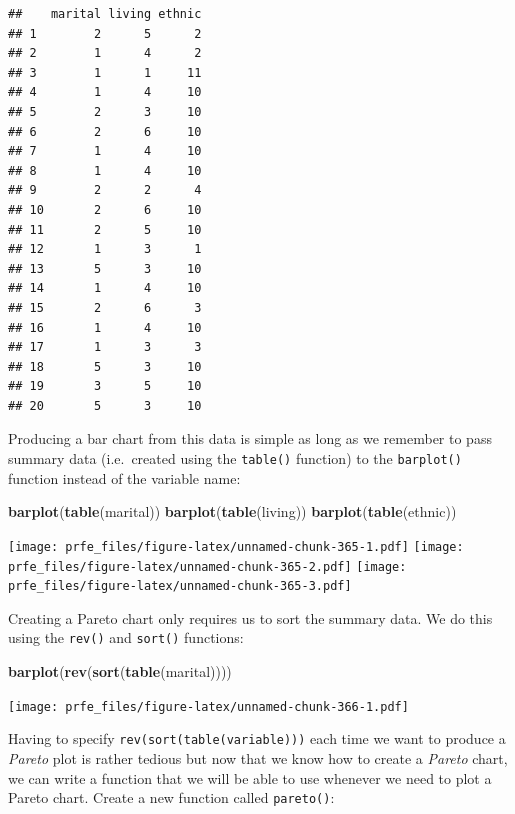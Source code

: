 \documentclass[12pt,]{book}
\newenvironment{Shaded}{\begin{snugshade}}{\end{snugshade}}
\newcommand{\KeywordTok}[1]{\textcolor[rgb]{0.13,0.29,0.53}{\textbf{#1}}}
\newcommand{\NormalTok}[1]{#1}
\theoremstyle{definition}
\theoremstyle{definition}
\theoremstyle{definition}
\theoremstyle{remark}
\begin{document}
\begin{verbatim}
##    marital living ethnic
## 1        2      5      2
## 2        1      4      2
## 3        1      1     11
## 4        1      4     10
## 5        2      3     10
## 6        2      6     10
## 7        1      4     10
## 8        1      4     10
## 9        2      2      4
## 10       2      6     10
## 11       2      5     10
## 12       1      3      1
## 13       5      3     10
## 14       1      4     10
## 15       2      6      3
## 16       1      4     10
## 17       1      3      3
## 18       5      3     10
## 19       3      5     10
## 20       5      3     10
\end{verbatim}

Producing a bar chart from this data is simple as long as we remember to
pass summary data (i.e.~created using the \texttt{table()} function) to
the \texttt{barplot()} function instead of the variable name:

\begin{Shaded}
\begin{Highlighting}[]
\KeywordTok{barplot}\NormalTok{(}\KeywordTok{table}\NormalTok{(marital))}
\KeywordTok{barplot}\NormalTok{(}\KeywordTok{table}\NormalTok{(living))}
\KeywordTok{barplot}\NormalTok{(}\KeywordTok{table}\NormalTok{(ethnic))}
\end{Highlighting}
\end{Shaded}

\texttt{[image: prfe\_files/figure-latex/unnamed-chunk-365-1.pdf]}
\texttt{[image: prfe\_files/figure-latex/unnamed-chunk-365-2.pdf]}
\texttt{[image: prfe\_files/figure-latex/unnamed-chunk-365-3.pdf]}

Creating a Pareto chart only requires us to sort the summary data. We do
this using the \texttt{rev()} and \texttt{sort()} functions:

\begin{Shaded}
\begin{Highlighting}[]
\KeywordTok{barplot}\NormalTok{(}\KeywordTok{rev}\NormalTok{(}\KeywordTok{sort}\NormalTok{(}\KeywordTok{table}\NormalTok{(marital))))}
\end{Highlighting}
\end{Shaded}

\texttt{[image: prfe\_files/figure-latex/unnamed-chunk-366-1.pdf]}

Having to specify \texttt{rev(sort(table(variable)))} each time we want
to produce a \emph{Pareto} plot is rather tedious but now that we know
how to create a \emph{Pareto} chart, we can write a function that we
will be able to use whenever we need to plot a Pareto chart. Create a
new function called \texttt{pareto()}:
\end{document}
